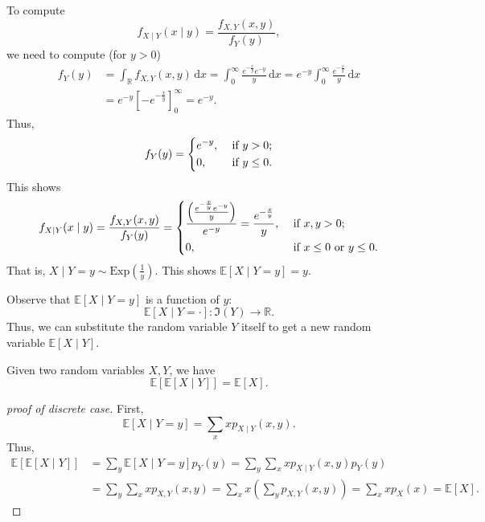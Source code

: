 \begin{explanation}
    To compute 
    \[
        f_{X \mid Y} (x \mid y) = \frac{f_{X, Y} (x, y)}{f_Y(y)},
    \]
    we need to compute (for \(y > 0\)) 
    \begin{align*}
        f_Y(y) &= \int _{\mathbb{R}} f_{X, Y} (x, y) \, \mathrm{d} x = \int _0^{\infty} \frac{e^{- \frac{x}{y}} e^{-y}}{y} \, \mathrm{d} x = e^{-y} \int _0^{\infty} \frac{e^{- \frac{x}{y}}}{y} \, \mathrm{d} x \\
        &= e^{-y} \left[ - e^{- \frac{x}{y}} \right]_0^{\infty} = e^{-y}.  
    \end{align*}
    Thus,
    \[
        f_Y(y) = \begin{dcases}
            e^{-y}, &\text{ if } y > 0 ;\\
            0, &\text{ if } y \le 0.
        \end{dcases}
    \]
    This shows 
    \[
        f_{X \mid Y}(x \mid y) = \frac{f_{X, Y} (x, y)}{f_Y(y)} = \begin{dcases}
            \frac{\left( \frac{e^{- \frac{x}{y}} e^{-y}}{y} \right) }{e^{-y}} = \frac{e^{- \frac{x}{y}}}{y}, &\text{ if } x, y > 0 ;\\
            0, &\text{ if }  x \le 0 \text{ or } y \le 0 .
        \end{dcases}
    \]
    That is, \(X \mid Y = y \sim \mathrm{Exp} \left( \frac{1}{y} \right)  \). This shows \(\mathbb{E} [X \mid Y = y] = y\). 
\end{explanation}

\begin{remark}
    Observe that \(\mathbb{E} [X \mid Y = y]\) is a function of \(y\): 
    \[
        \mathbb{E} [X \mid Y = \cdot ] : \Im (Y) \to \mathbb{R}.
    \]  
    Thus, we can substitute the random variable \(Y\) itself to get a new random variable \(\mathbb{E} [X \mid Y]\). 
\end{remark}

\begin{proposition}
    Given two random variables \(X, Y\), we have 
    \[
        \mathbb{E} \left[ \mathbb{E} [X \mid Y] \right] = \mathbb{E} [X]. 
    \] 
\end{proposition}

\begin{proof}[proof of discrete case]
    First,
    \[
        \mathbb{E} [X \mid Y = y] = \sum_{x} x p_{X \mid Y} (x, y). 
    \]
    Thus, 
    \begin{align*}
        \mathbb{E} [\mathbb{E} [X \mid Y]] &= \sum_{y} \mathbb{E} [X \mid Y = y] p_Y(y) = \sum_{y} \sum_{x} x p_{X \mid Y} (x, y) p_Y(y) \\
        &= \sum_{y} \sum_{x}x p_{X, Y}(x, y) = \sum_{x} x \left( \sum_{y} p_{X, Y}(x, y)  \right) = \sum_{x} x p_X(x) = \mathbb{E} [X].          
    \end{align*}
\end{proof}

